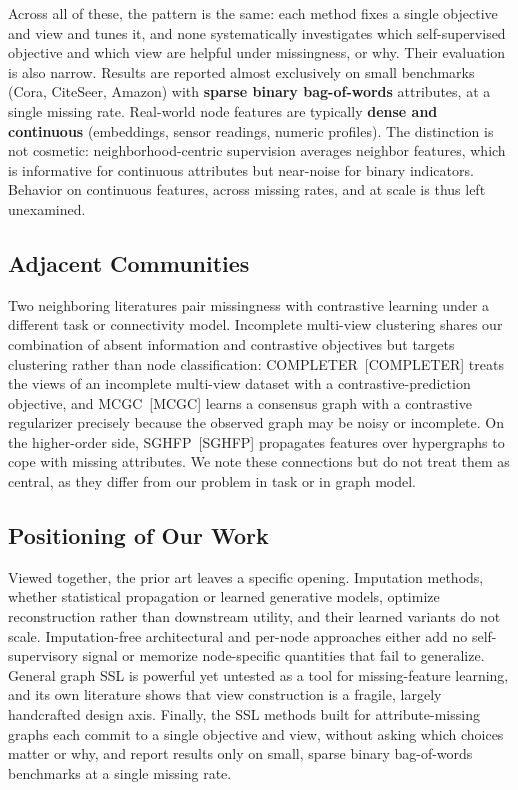 Across all of these, the pattern is the same: each method fixes a single objective and view and tunes it, and none systematically investigates which self-supervised objective and which view are helpful under missingness, or why. Their evaluation is also narrow. Results are reported almost exclusively on small benchmarks (Cora, CiteSeer, Amazon) with \textbf{sparse binary bag-of-words} attributes, at a single missing rate. Real-world node features are typically \textbf{dense and continuous} (embeddings, sensor readings, numeric profiles). The distinction is not cosmetic: neighborhood-centric supervision averages neighbor features, which is informative for continuous attributes but near-noise for binary indicators. Behavior on continuous features, across missing rates, and at scale is thus left unexamined.

\subsection{Adjacent Communities}
\label{sec:related-adjacent}

Two neighboring literatures pair missingness with contrastive learning under a different task or connectivity model. Incomplete multi-view clustering shares our combination of absent information and contrastive objectives but targets clustering rather than node classification: COMPLETER~[COMPLETER] treats the views of an incomplete multi-view dataset with a contrastive-prediction objective, and MCGC~[MCGC] learns a consensus graph with a contrastive regularizer precisely because the observed graph may be noisy or incomplete. On the higher-order side, SGHFP~[SGHFP] propagates features over hypergraphs to cope with missing attributes. We note these connections but do not treat them as central, as they differ from our problem in task or in graph model.

\subsection{Positioning of Our Work}
\label{sec:related-positioning}

Viewed together, the prior art leaves a specific opening. Imputation methods, whether statistical propagation or learned generative models, optimize reconstruction rather than downstream utility, and their learned variants do not scale. Imputation-free architectural and per-node approaches either add no self-supervisory signal or memorize node-specific quantities that fail to generalize. General graph SSL is powerful yet untested as a tool for missing-feature learning, and its own literature shows that view construction is a fragile, largely handcrafted design axis. Finally, the SSL methods built for attribute-missing graphs each commit to a single objective and view, without asking which choices matter or why, and report results only on small, sparse binary bag-of-words benchmarks at a single missing rate.

